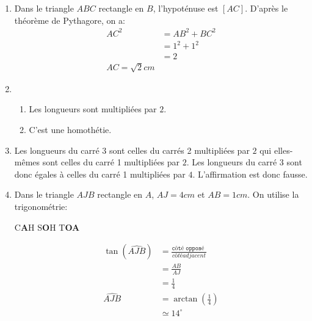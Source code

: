 
\begin{enumerate}
\item Dans le triangle $ABC$ rectangle en $B$, l'hypoténuse est $[AC]$. D'après le théorème de Pythagore, on a:
\begin{align*}
AC^2&=AB^2+BC^2\\
&=1^2+1^2\\
&=2\\
AC=\sqrt{2} cm
\end{align*}
\item
	\begin{enumerate}
		\item Les longueurs sont multipliées par $2$.
		\item C'est une homothétie.
	\end{enumerate}
\item Les longueurs du carré 3 sont celles du carrés 2 multipliées par $2$ qui elles-mêmes sont celles du carré 1 multipliées par $2$. Les longueurs du carré 3 sont donc égales à celles du carré 1 multipliées par $4$. L'affirmation est donc fausse.
\item Dans le triangle $AJB$ rectangle en $A$, $AJ=4cm$ et $AB=1cm$. On utilise la trigonométrie:

\begin{center}
C\textbf{A}H \hspace{20 pt} S\textbf{O}H \hspace{20 pt} T\textbf{O}\textbf{A}
\end{center}

\begin{align*}
\tan (\widehat{AJB})&=\frac{\texttt{côté opposé }}{côté adjacent}\\
&=\frac{AB}{AJ}\\
&=\frac{1}{4}\\
\widehat{AJB}&=\arctan\left(\frac{1}{4}\right)\\
&\simeq 14^\circ
\end{align*}

\end{enumerate}

